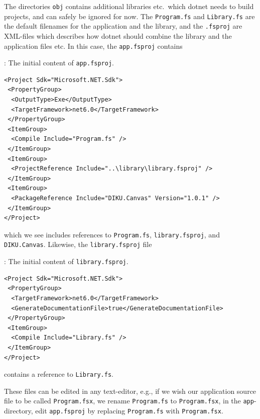 \documentclass[fsharpNotes.tex]{subfiles}
\begin{document}
The directories \lstinline[language=console]{obj} contains additional libraries etc.\ which dotnet needs to build projects, and can safely be ignored for now. The \lstinline[language=console]{Program.fs} and \lstinline[language=console]{Library.fs} are the default filenames for the application and the library, and the \lstinline[language=console]{.fsproj} are XML-files which describes how dotnet should combine the library and the application files etc. In this case, the \lstinline[language=console]{app.fsproj} contains
\begin{codeNOutput}[label=appFsproj,
  top=-5pt,
  bottom=-5pt,
  left=-2pt,
  right=-2pt,
]{: The initial content of \texttt{app.fsproj}.}
  \begin{lstlisting}[language=console,escapechar=§]
<Project Sdk="Microsoft.NET.Sdk">
 <PropertyGroup>
  <OutputType>Exe</OutputType>
  <TargetFramework>net6.0</TargetFramework>
 </PropertyGroup>
 <ItemGroup>
  <Compile Include="Program.fs" />
 </ItemGroup>
 <ItemGroup>
  <ProjectReference Include="..\library\library.fsproj" />
 </ItemGroup>
 <ItemGroup>
  <PackageReference Include="DIKU.Canvas" Version="1.0.1" />
 </ItemGroup>
</Project>
\end{lstlisting}
\end{codeNOutput}
which we see includes references to \lstinline[language=console]{Program.fs}, \lstinline[language=console]{library.fsproj}, and \lstinline[language=console]{DIKU.Canvas}.
Likewise, the \lstinline[language=console]{library.fsproj} file
\begin{codeNOutput}[label=libraryFsproj,
  top=-5pt,
  bottom=-5pt,
  left=-2pt,
  right=-2pt,
]{: The initial content of \texttt{library.fsproj}.}
  \begin{lstlisting}[language=console,escapechar=§]
<Project Sdk="Microsoft.NET.Sdk">
 <PropertyGroup>
  <TargetFramework>net6.0</TargetFramework>
  <GenerateDocumentationFile>true</GenerateDocumentationFile>
 </PropertyGroup>
 <ItemGroup>
  <Compile Include="Library.fs" />
 </ItemGroup>
</Project>
\end{lstlisting}
\end{codeNOutput}
contains a reference to \lstinline[language=console]{Library.fs}.

These files can be edited in any text-editor, e.g., if we wish our application source file to be called \lstinline[language=console]{Program.fsx}, we rename \lstinline[language=console]{Program.fs} to \lstinline[language=console]{Program.fsx}, in the \lstinline[language=console]{app}-directory, edit \lstinline[language=console]{app.fsproj} by replacing \lstinline[language=console]{Program.fs} with \lstinline[language=console]{Program.fsx}.
\end{document}
